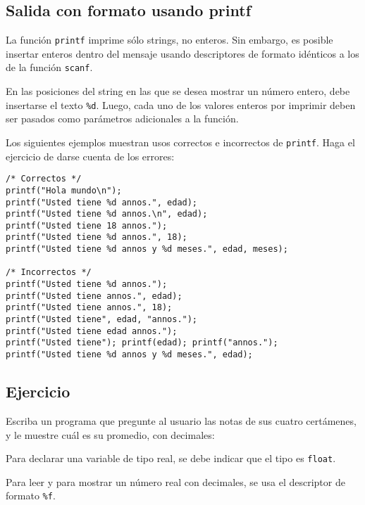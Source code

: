 \subsection{Salida con formato usando printf}

La función \lstinline!printf! imprime sólo strings, no enteros. Sin
embargo, es posible insertar enteros dentro del mensaje usando
descriptores de formato idénticos a los de la función \lstinline!scanf!.

En las posiciones del string en las que se desea mostrar un número
entero, debe insertarse el texto \lstinline!%d!. Luego, cada uno de los
valores enteros por imprimir deben ser pasados como parámetros
adicionales a la función.

Los siguientes ejemplos muestran usos correctos e incorrectos de
\lstinline!printf!. Haga el ejercicio de darse cuenta de los errores:

\begin{lstlisting}
/* Correctos */
printf("Hola mundo\n");
printf("Usted tiene %d annos.", edad);
printf("Usted tiene %d annos.\n", edad);
printf("Usted tiene 18 annos.");
printf("Usted tiene %d annos.", 18);
printf("Usted tiene %d annos y %d meses.", edad, meses);

/* Incorrectos */
printf("Usted tiene %d annos.");
printf("Usted tiene annos.", edad);
printf("Usted tiene annos.", 18);
printf("Usted tiene", edad, "annos.");
printf("Usted tiene edad annos.");
printf("Usted tiene"); printf(edad); printf("annos.");
printf("Usted tiene %d annos y %d meses.", edad);
\end{lstlisting}

\subsection{Ejercicio}

Escriba un programa que pregunte al usuario las notas de sus cuatro
certámenes, y le muestre cuál es su promedio, con decimales:

Para declarar una variable de tipo real, se debe indicar que el tipo es
\lstinline!float!.

Para leer y para mostrar un número real con decimales, se usa el
descriptor de formato \lstinline!%f!.
